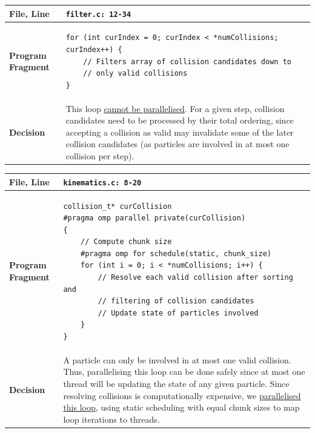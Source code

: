 \documentclass[12pt]{article}
\newcommand{\bt}[1]{\texttt{\textbf{#1}}}
\begin{document}
\begin{center}
\begin{tabular}{ | m{5em} | m{33em} | } 
\hline
\textbf{File, Line} & \bt{filter.c: 12-34} \\ \hline
\textbf{Program Fragment} &
\begin{verbatim}
for (int curIndex = 0; curIndex < *numCollisions; curIndex++) {
    // Filters array of collision candidates down to
    // only valid collisions
}
\end{verbatim}
\\ \hline
\textbf{Decision} &
This loop \ul{cannot be parallelised}. For a given step, collision candidates need to be processed by their total ordering, since accepting a collision as valid may invalidate some of the later collision candidates (as particles are involved in at most one collision per step).
\\ \hline
\end{tabular}
\end{center}

\begin{center}
\begin{tabular}{ | m{5em} | m{33em} | } 
\hline
\textbf{File, Line} & \bt{kinematics.c: 8-20} \\ \hline
\textbf{Program Fragment} &
\begin{verbatim}
collision_t* curCollision
#pragma omp parallel private(curCollision)
{
    // Compute chunk size
    #pragma omp for schedule(static, chunk_size)
    for (int i = 0; i < *numCollisions; i++) {
        // Resolve each valid collision after sorting and
        // filtering of collision candidates
        // Update state of particles involved
    }
}
\end{verbatim}
\\ \hline
\textbf{Decision} &
A particle can only be involved in at most one valid collision. Thus, parallelising this loop can be done safely since at most one thread will be updating the state of any given particle. Since resolving collisions is computationally expensive, we \ul{parallelised this loop}, using static scheduling with equal chunk sizes to map loop iterations to threads.
\\ \hline
\end{tabular}
\end{center}
\end{document}
